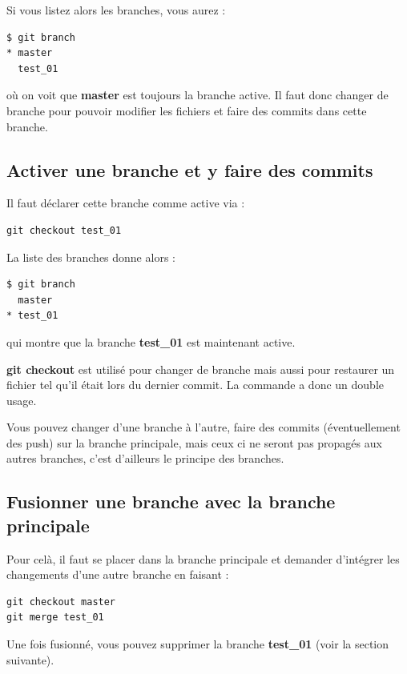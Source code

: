 \documentclass[a4paper,twoside]{article}
\begin{document}
Si vous listez alors les branches, vous aurez :
\begin{verbatim}
$ git branch
* master
  test_01
\end{verbatim}
où on voit que \textbf{master} est toujours la branche active. Il faut donc changer de branche pour pouvoir modifier les fichiers et faire des commits dans cette branche.

\subsection{Activer une branche et y faire des commits}
Il faut déclarer cette branche comme active via :
\begin{verbatim}
git checkout test_01
\end{verbatim}

La liste des branches donne alors :
\begin{verbatim}
$ git branch
  master
* test_01
\end{verbatim}
qui montre que la branche \textbf{test\_01} est maintenant active.

\begin{remarque}
\textbf{git checkout} est utilisé pour changer de branche mais aussi pour restaurer un fichier tel qu'il était lors du dernier commit. La commande a donc un double usage.
\end{remarque}

\begin{attention}
Vous pouvez changer d'une branche à l'autre, faire des commits (éventuellement des push) sur la branche principale, mais ceux ci ne seront pas propagés aux autres branches, c'est d'ailleurs le principe des branches. 
\end{attention}

\subsection{Fusionner une branche avec la branche principale}
Pour celà, il faut se placer dans la branche principale et demander d'intégrer les changements d'une autre branche en faisant : 
\begin{verbatim}
git checkout master
git merge test_01
\end{verbatim}

Une fois fusionné, vous pouvez supprimer la branche \textbf{test\_01} (voir la section suivante).
\end{document}
